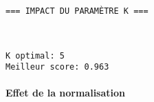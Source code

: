 \documentclass[11pt]{article}
\begin{document}
    \begin{center}
    \end{center}
    { \hspace*{\fill} \\}
    
    \begin{Verbatim}[commandchars=\\\{\}]

=== IMPACT DU PARAMÈTRE K ===
    \end{Verbatim}

    \begin{center}
    \end{center}
    { \hspace*{\fill} \\}
    
    \begin{Verbatim}[commandchars=\\\{\}]
K optimal: 5
Meilleur score: 0.963
    \end{Verbatim}

    \paragraph{Effet de la normalisation}\label{effet-de-la-normalisation}
\end{document}
